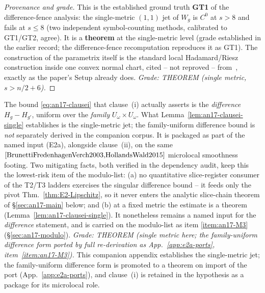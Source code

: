 \begin{proof}[Provenance and grade]
This is the established ground truth \textbf{GT1} of the
difference-fence analysis: the single-metric $(1,1)$ jet of $W_g$
is $C^0$ at $s>8$ and fails at $s\le8$ (two independent
symbol-counting methods, calibrated to GT1/GT2, agree).  It is a
\textbf{theorem} at the single-metric level (grade established in the
earlier record; the difference-fence recomputation reproduces it as
GT1).  The construction of the parametrix itself is the standard local
Hadamard/Riesz construction inside one convex normal chart, cited --
not reproved -- from~\cite{Moretti2003,KayWald1991}, exactly as the
paper's Setup already does.  \emph{Grade: THEOREM (single metric,
$s>n/2+6$).}
\end{proof}

\begin{remark}\label{rem:an17-clausei-diff}
The bound \eqref{eq:an17-clausei} that clause~(i) actually asserts is
the \emph{difference} $H_g-H_{g'}$, uniform over the \emph{family}
$U_\omega\times U_\omega$.  What Lemma~\ref{lem:an17-clausei-single}
establishes is the single-metric jet; the family-uniform difference bound is
\emph{not} separately derived in the companion corpus.  It is packaged
as part of the named input (E2a), alongside clause~(ii), on the same
$\cite{BrunettiFredenhagenVerch2003,HollandsWald2015}$ microlocal
smoothness footing.  Two mitigating facts, both verified in the
dependency audit, keep this the lowest-risk item of the modulo-list:
(a) no quantitative slice-register consumer of the T2/T3 ladders
exercises the singular difference bound -- it feeds only the pivot
Thm.~\ref{thm:E2-Lipschitz}, so it never enters the analytic
slice-chain theorem of \S\ref{sec:an17-main} below; and (b) at a fixed
metric the estimate is a theorem
(Lemma~\ref{lem:an17-clausei-single}).  It nonetheless remains a named
input for the \emph{difference} statement, and is carried on the
modulo-list as item \ref{item:an17-M3} (\S\ref{sec:an17-modulo}).
\emph{Grade: THEOREM (single metric here; the family-uniform
difference form ported by full re-derivation as
App.~\ref{app:e2a-ports}, item~\ref{item:an17-M3}).}
This companion appendix establishes the single-metric jet; the
family-uniform difference form is promoted to a theorem on import of
the port (App.~\ref{app:e2a-ports}), and clause~(i) is retained in
the hypothesis as a package for its microlocal role.
\end{remark}

